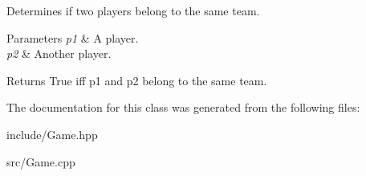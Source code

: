 Determines if two players belong to the same team. 


\begin{DoxyParams}{Parameters}
{\em p1} & A player. \\
\hline
{\em p2} & Another player. \\
\hline
\end{DoxyParams}
\begin{DoxyReturn}{Returns}
True iff p1 and p2 belong to the same team. 
\end{DoxyReturn}


The documentation for this class was generated from the following files\-:\begin{DoxyCompactItemize}
\item 
include/Game.\-hpp\item 
src/Game.\-cpp\end{DoxyCompactItemize}
